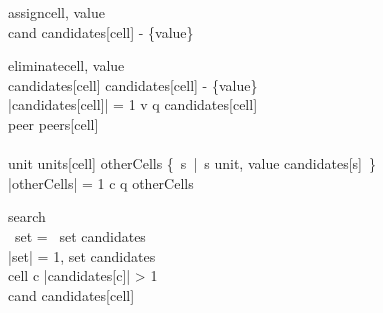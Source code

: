 \begin{center}
\begin{pseudocode}[framebox]{assign}{cell, value}
     \\
    \FOR cand \in candidates[cell] - \{value\} \DO {}
    \label{algo:assign}
\end{pseudocode}
\begin{pseudocode}[framebox]{eliminate}{cell, value}
       \\
    candidates[cell] \GETS candidates[cell] - \{value\}         \\
    \IF |candidates[cell]| = 1 \THEN \BEGIN
        v \GETS q \in candidates[cell]                          \\
        \FOR peer \in peers[cell] \DO {} \\
    \END                                                        \\
    
    \FOR unit \in units[cell] \DO \BEGIN
        otherCells \GETS \{~s~|~s \in unit, value \in candidates[s]~\}  \\
        \IF |otherCells| = 1 \THEN \BEGIN
            c \GETS q \in otherCells                                    \\
        \END
    \END
    \label{algo:eliminate}
\end{pseudocode}
\begin{pseudocode}[framebox]{search}{ }
     \\
    \IF \exists~set = \emptyset~\forall set \in candidates \THEN \RETURN \FALSE     \\
    \IF |set| = 1, \forall set \in candidates \THEN \RETURN \TRUE                   \\
    cell \GETS c  |candidates[c]| > 1 \AND {}      \\
    \FOR cand \in candidates[cell] \DO \BEGIN
                           \\
        \IF {} \THEN {}
        \ELSE {}       \\
    \END                                            \\
    \RETURN \FALSE
    \label{algo:clp}
\end{pseudocode}
\end{center}


